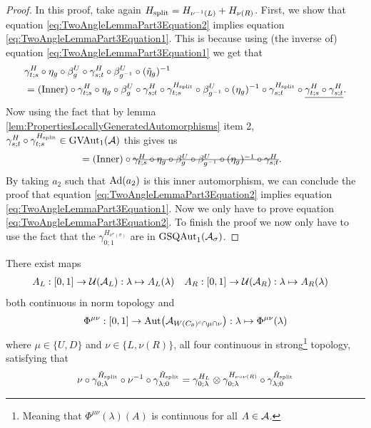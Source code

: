 \documentclass[11pt,a4paper,twoside]{article}
\numberwithin{equation}{section}
\begin{document}
{\begin{proof}
		In this proof, take again $\Hsplit=H_{\nu^{-1}(L)}+H_{\nu(R)}$. First, we show that equation \eqref{eq:TwoAngleLemmaPart3Equation2} implies equation \eqref{eq:TwoAngleLemmaPart3Equation1}. This is because using (the inverse of) equation \eqref{eq:TwoAngleLemmaPart3Equation1} we get that
		\begin{align}
			&\gamma^H_{t;s}\circ\eta_g\circ\beta_g^U\circ\gamma^H_{s;t}\circ\beta_{g^{-1}}^U\circ(\tilde{\eta}_g)^{-1}\\
			&=(\text{Inner})\circ \gamma^H_{t;s}\circ\eta_g\circ\beta_g^U\circ\gamma^H_{s;t}\circ\gamma^\Hsplit_{t;s}\circ\beta_{g^{-1}}^U\circ(\eta_g)^{-1}\circ\gamma^\Hsplit_{s;t}\circ\underline{\gamma^H_{t;s}\circ\gamma^H_{s;t}}.
		\end{align}
		Now using the fact that by lemma \ref{lem:PropertiesLocallyGeneratedAutomorphisms} item 2, $\gamma^H_{s;t}\circ\gamma^\Hsplit_{t;s}\in\textrm{GVAut}_1(\AA)$ this gives us
		\begin{align}
			&=(\text{Inner})\circ\stkout{\gamma^H_{t;s}\circ\eta_g\circ\beta_g^U\circ\beta_{g^{-1}}^U\circ(\eta_g)^{-1}\circ\gamma^H_{s;t}}.
		\end{align}
		By taking $a_2$ such that $\Ad{a_2}$ is this inner automorphism, we can conclude the proof that equation \eqref{eq:TwoAngleLemmaPart3Equation2} implies equation \eqref{eq:TwoAngleLemmaPart3Equation1}. Now we only have to prove equation \eqref{eq:TwoAngleLemmaPart3Equation2}. To finish the proof we now only have to use the fact that the $\gamma^{H_{\nu^{\sigma}(\sigma)}}_{0;1}$ are in $\textrm{GSQAut}_1(\AA_\sigma)$.
	\end{proof}
	\begin{lemma}\label{lem:SplittedAutomorphismAfterTranslatedIsVertical}
		There exist maps
		\begin{align}
			A_L&:[0,1]\rightarrow \UU(\AA_L):\lambda\mapsto A_{L}(\lambda)&A_R&:[0,1]\rightarrow \UU(\AA_R):\lambda\mapsto A_{R}(\lambda)
		\end{align}
		both continuous in norm topology and
		\begin{align}
			\Phi^{\mu\nu}:[0,1]\rightarrow\Aut{\AA_{W(C_\theta)^c\cap\mu\cap\nu}}:\lambda\mapsto \Phi^{\mu\nu}(\lambda)
		\end{align}
		where $\mu\in\{U,D\}$ and $\nu\in\{L,\nu(R)\}$, all four continuous in  strong\footnote{Meaning that $\Phi^{\mu\nu}(\lambda)(A)$ is continuous for all $A\in\AA$.} topology, satisfying that
		\begin{align}
			\nu\circ\gamma^{\HsplitTilde}_{0;\lambda}\circ\nu^{-1}\circ\gamma^{\HsplitTilde}_{\lambda;0}&=\gamma^{H_L}_{0;\lambda}\otimes\gamma^{H_{\nu\circ\nu(R)}}_{0;\lambda}\circ\gamma^{\HsplitTilde}_{\lambda;0}\\

\end{align}
\end{lemma}}
\end{document}
